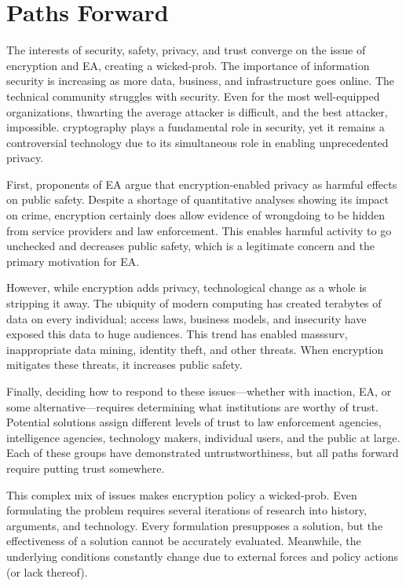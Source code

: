 \chapter{Paths Forward}
\label{chap-pathsforward}

The interests of security, safety, privacy, and trust converge on the issue of encryption and \acl{EA}, creating a
\ac{wicked-prob}. The importance of information security is increasing as more data, business, and infrastructure goes
online. The technical community struggles with security. Even for the most well-equipped organizations, thwarting the
average attacker is difficult, and the best attacker, impossible. \Ac{cryptography} plays a fundamental role in
security, yet it remains a controversial technology due to its simultaneous role in enabling unprecedented privacy.

First, proponents of \acl{EA} argue that encryption-enabled privacy as harmful effects on public safety. Despite a
shortage of quantitative analyses showing its impact on crime, encryption certainly does allow evidence of wrongdoing to
be hidden from service providers and law enforcement. This enables harmful activity to go unchecked and decreases public
safety, which is a legitimate concern and the primary motivation for \ac{EA}.

However, while encryption adds privacy, technological change as a whole is stripping it away. The ubiquity of modern
computing has created terabytes of data on every individual; access laws, business models, and insecurity have exposed
this data to huge audiences. This trend has enabled \ac{masssurv}, inappropriate data mining, identity theft, and other
threats. When encryption mitigates these threats, it increases public safety.

Finally, deciding how to respond to these issues---whether with inaction, \ac{EA}, or some alternative---requires
determining what institutions are worthy of trust. Potential solutions assign different levels of trust to law
enforcement agencies, intelligence agencies, technology makers, individual users, and the public at large. Each of these
groups have demonstrated untrustworthiness, but all paths forward require putting trust somewhere.

This complex mix of issues makes encryption policy a \ac{wicked-prob}. Even formulating the problem requires several
iterations of research into history, arguments, and technology. Every formulation presupposes a solution, but the
effectiveness of a solution cannot be accurately evaluated. Meanwhile, the underlying conditions constantly change due
to external forces and policy actions (or lack thereof).


